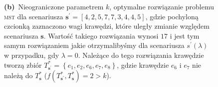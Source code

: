 \begin{figure}[!htbp]
{		\textbf{(b)}~Nieograniczone parametrem $k$, optymalne rozwiązanie problemu \textsc{mst} dla scenariusza $\textbf{s}^{\prime} = \left[ \textit{4}, 2, \textit{5}, 7, \textit{7}, 3, \textit{4}, 4, 5 \right]$, gdzie pochyloną czcionką zaznaczono wagi krawędzi, które uległy zmianie względem scenariusza $\textbf{s}$. Wartość takiego rozwiązania wynosi $17$ i jest tym samym rozwiązaniem jakie otrzymalibyśmy dla scenariusza $s^{\prime} \left( \lambda \right)$ w przypadku, gdy $\lambda = 0$. Należące do tego rozwiązania krawędzie tworzą zbiór $T^{\ast}_{\textbf{s}^{\prime}} = \left\{ e_{1}, e_{2}, e_{6}, e_{7}, e_{8} \right\}$, gdzie krawędzie $e_{6}$ i $e_{7}$ nie należą do $T^{\ast}_{\textbf{s}}$ ($f \left( T^{\ast}_{\textbf{s}^{\prime}}, T^{\ast}_{\textbf{s}} \right) = 2 > k$).
	}
\end{figure}

